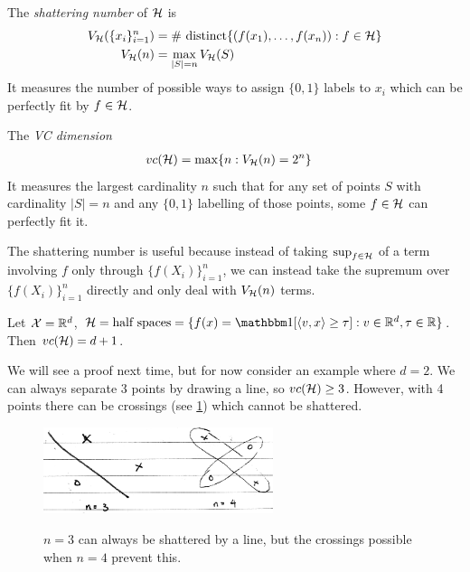 \begin{definition}
    The \emph{shattering number} of $\mathcal{H}$ is
    \begin{align}
        V_{\mathcal{H}}(\{x_i\}_{i=1}^n) &= \text{\# distinct} \{(f(x_1), \ldots, f(x_n)) : f \in \mathcal{H}\} \\
        V_{\mathcal{H}}(n) &= \max_{\lvert S \rvert = n} V_{\mathcal{H}}(S)
    \end{align}
    It measures the number of possible ways to assign $\{0,1\}$ labels to $x_i$ which can be perfectly
    fit by $f \in \mathcal{H}$.
    
    The \emph{VC dimension}
    \begin{align}
        vc(\mathcal{H}) &= \max\{ n : V_{\mathcal{H}}(n) = 2^n\}\label{eq:vc-dim-def}
    \end{align}
    It measures the largest cardinality $n$ such that for any set of points $S$ with cardinality $\lvert S \rvert = n$
    and any $\{0,1\}$ labelling of those points, some $f \in \mathcal{H}$ can perfectly fit it.
\end{definition}

The shattering number is useful because instead of taking $\sup_{f \in \mathcal{H}}$ of a term
involving $f$ only through $\{f(X_i)\}_{i=1}^n$, we can instead take the supremum over
$\{f(X_i)\}_{i=1}^n$ directly and only deal with $V_{\mathcal{H}}(n)$ terms.

\begin{example}\label{eg:half-spaces-vc}
    Let $\mathcal{X} = \mathbb{R}^d$, $\cH = \text{half spaces} = \{f(x) = \ind[\braket{v,x} \geq \tau] : v \in \RR^d, \tau \in \RR \}$.
    Then $vc(\mathcal{H}) = d+1$.
    
    We will see a proof next time, but for now consider an example where $d=2$.
    We can always separate 3 points by drawing a line, so $vc(\mathcal{H}) \geq 3$.
    However, with 4 points there can be crossings (see \cref{fig:9-10-vc-hs}) which cannot be shattered.
        \begin{figure}[H]
        \centering
        \includegraphics[width=0.6\textwidth]{figures/9-10-2.png}
        \label{fig:9-10-vc-hs}
        \caption{$n=3$ can always be shattered by a line, but the crossings possible when $n=4$ prevent this.}
    \end{figure}
\end{example}

